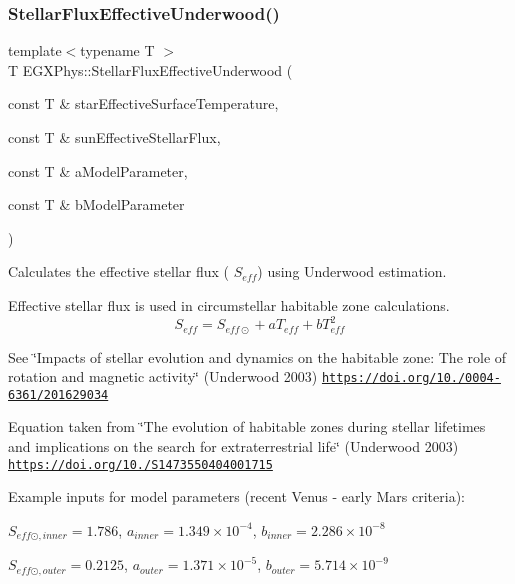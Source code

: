 \subsubsection{\texorpdfstring{Stellar\+Flux\+Effective\+Underwood()}{StellarFluxEffectiveUnderwood()}}
{\footnotesize\ttfamily template$<$typename T $>$ \\
T E\+G\+X\+Phys\+::\+Stellar\+Flux\+Effective\+Underwood (\begin{DoxyParamCaption}\item[{const T \&}]{star\+Effective\+Surface\+Temperature,  }\item[{const T \&}]{sun\+Effective\+Stellar\+Flux,  }\item[{const T \&}]{a\+Model\+Parameter,  }\item[{const T \&}]{b\+Model\+Parameter }\end{DoxyParamCaption})}



Calculates the effective stellar flux ( $S_{eff}$) using Underwood estimation. 

Effective stellar flux is used in circumstellar habitable zone calculations. \[S_{eff}=S_{eff\odot}+aT_{eff}+bT^2_{eff}\]

See \char`\"{}\+Impacts of stellar evolution and dynamics on the habitable zone\+: The role of rotation and magnetic activity\char`\"{} (Underwood 2003) \href{https://doi.org/10.1051/0004-6361/201629034}{\tt https\+://doi.\+org/10./0004-\/6361/201629034}

Equation taken from \char`\"{}\+The evolution of habitable zones during stellar lifetimes and implications on the search for extraterrestrial life\char`\"{} (Underwood 2003) \href{https://doi.org/10.1017/S1473550404001715}{\tt https\+://doi.\+org/10./\+S1473550404001715}

Example inputs for model parameters (recent Venus -\/ early Mars criteria)\+:

$S_{eff\odot,inner} = 1.786$, $a_{inner} = 1.349 \times 10^{-4}$, $b_{inner} = 2.286 \times 10^{-8}$

$S_{eff\odot,outer} = 0.2125$, $a_{outer} = 1.371 \times 10^{-5}$, $b_{outer} = 5.714 \times 10^{-9}$


